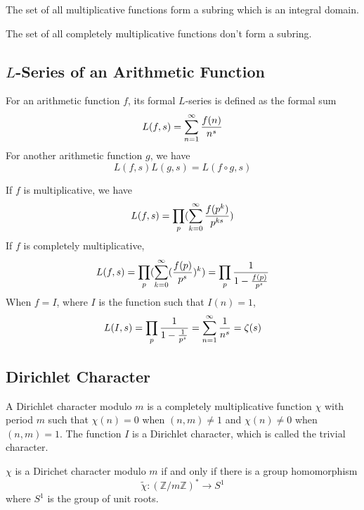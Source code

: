 \documentclass{article}
\begin{document}
The set of all multiplicative functions form a subring which is an integral domain.

The set of all completely multiplicative functions don't form a subring.

\subsection{$L$-Series of an Arithmetic Function}
For an arithmetic function $f$, its formal $L$-series is defined as the formal sum
\begin{equation*}
  L(f, s) = \sum_{n=1}^\infty {f(n) \over n^s}
\end{equation*}
For another arithmetic function $g$, we have
\begin{equation*}
  L(f, s) L(g, s) = L(f \circ g, s)
\end{equation*}

If $f$ is multiplicative, we have
\begin{equation*}
  L(f, s) = \prod_p (\sum_{k=0}^\infty {f(p^k) \over p^{ks}})
\end{equation*}
If $f$ is completely multiplicative,
\begin{equation*}
  L(f, s)
  = \prod_p (\sum_{k=0}^\infty ({f(p) \over p^s})^k)
  = \prod_p {1 \over 1 - {f(p) \over p^s}}
\end{equation*}
When $f = I$, where $I$ is the function such that $I(n) = 1$,
\begin{equation*}
  L(I, s)
  = \prod_p {1 \over 1 - {1 \over p^s}}
  = \sum_{n=1}^\infty {1 \over n^s}
  = \zeta(s)
\end{equation*}

\subsection{Dirichlet Character}
A Dirichlet character modulo $m$ is a completely multiplicative function $\chi$
with period $m$ such that $\chi(n) = 0$ when $(n, m) \neq 1$
and $\chi(n) \neq 0$ when $(n, m) = 1$. The function $I$ is a Dirichlet character,
which is called the trivial character.

$\chi$ is a Dirichet character modulo $m$ if and only if there is a group homomorphism
$$\tilde\chi : (\mathbb Z / m \mathbb Z)^\ast \to S^1$$
where $S^1$ is the group of unit roots.
\end{document}
